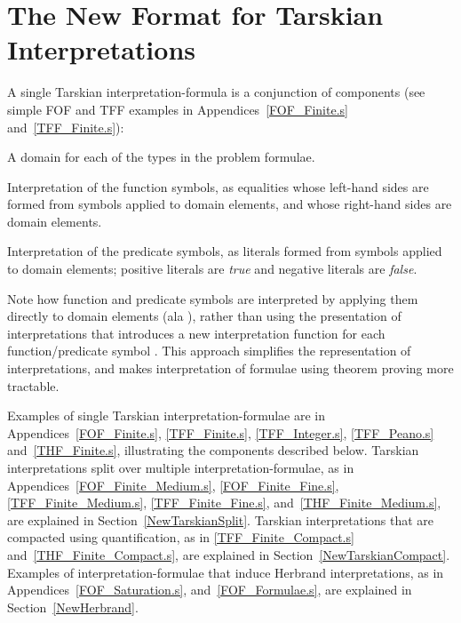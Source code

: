 \documentclass{easychair}
\newenvironment{packed_itemize}{
\vspace*{-0.3em}
\begin{itemize}
\setlength{\partopsep}{0pt}
\setlength{\itemsep}{1pt}
\setlength{\parskip}{0pt}
\setlength{\parsep}{0pt}
}{\end{itemize}}
\begin{document}
\section{The New Format for Tarskian Interpretations}
\label{NewTarskian}

A single Tarskian interpretation-formula is a conjunction of components (see simple FOF and TFF
examples in Appendices~\ref{FOF_Finite.s} and~\ref{TFF_Finite.s}):
\begin{packed_itemize}
\item A domain for each of the types in the problem formulae.
\item Interpretation of the function symbols, as equalities whose left-hand sides are formed from 
      symbols applied to domain elements, and whose right-hand sides are domain elements.
\item Interpretation of the predicate symbols, as literals formed from symbols applied
      to domain elements; positive literals are {\em true} and negative literals are {\em false}.
\end{packed_itemize}

Note how function and predicate symbols are interpreted by applying them directly to domain
elements (ala \cite[\S5.3.4]{Gal15}), rather than using the presentation of interpretations
that introduces a new interpretation function for each function/predicate symbol 
\cite[\S5.3.2]{Gal15}.
This approach simplifies the representation of interpretations, and makes interpretation of 
formulae using theorem proving more tractable.

Examples of single Tarskian interpretation-formulae are in Appendices~\ref{FOF_Finite.s}, 
\ref{TFF_Finite.s}, \ref{TFF_Integer.s}, \ref{TFF_Peano.s} and~\ref{THF_Finite.s}, illustrating 
the components described below. 
Tarskian interpretations split over multiple interpretation-formulae, as in 
Appendices~\ref{FOF_Finite_Medium.s}, \ref{FOF_Finite_Fine.s}, \ref{TFF_Finite_Medium.s}, 
\ref{TFF_Finite_Fine.s}, and~\ref{THF_Finite_Medium.s}, are explained in 
Section~\ref{NewTarskianSplit}.
Tarskian interpretations that are compacted using quantification, as in \ref{TFF_Finite_Compact.s}
and~\ref{THF_Finite_Compact.s}, are explained in Section~\ref{NewTarskianCompact}.
Examples of interpretation-formulae that induce Herbrand interpretations, as in 
Appendices~\ref{FOF_Saturation.s}, and~\ref{FOF_Formulae.s}, are explained in 
Section~\ref{NewHerbrand}.
\end{document}

